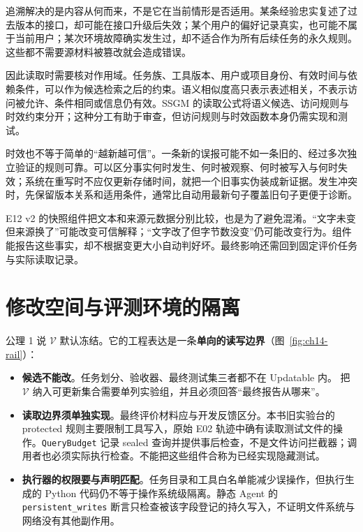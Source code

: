 追溯解决的是内容从何而来，不是它在当前情形是否适用。某条经验忠实复述了过去版本的接口，却可能在接口升级后失效；某个用户的偏好记录真实，也可能不属于当前用户；某次环境故障确实发生过，却不适合作为所有后续任务的永久规则。这些都不需要源材料被篡改就会造成错误。

因此读取时需要核对作用域。任务族、工具版本、用户或项目身份、有效时间与依赖条件，可以作为候选检索之后的约束。语义相似度高只表示表述相关，不表示访问被允许、条件相同或信息仍有效。SSGM 的读取公式将语义候选、访问规则与时效约束分开\cite{ssgm-2603}；这种分工有助于审查，但访问规则与时效函数本身仍需实现和测试。

时效也不等于简单的“越新越可信”。一条新的误报可能不如一条旧的、经过多次独立验证的规则可靠。可以区分事实何时发生、何时被观察、何时被写入与何时失效；系统在重写时不应仅更新存储时间，就把一个旧事实伪装成新证据。发生冲突时，先保留版本关系和适用条件，通常比自动用最新句子覆盖旧句子更便于诊断。

E12 v2 的快照组件把文本和来源元数据分别比较，也是为了避免混淆。“文字未变但来源换了”可能改变可信解释；“文字改了但字节数没变”仍可能改变行为。组件能报告这些事实，却不根据变更大小自动判好坏。最终影响还需回到固定评价任务与实际读取记录。

\section{修改空间与评测环境的隔离}
\label{sec:ch14-iso}

\begin{sloppypar}
公理 1 说 $\mathcal V$ 默认冻结。它的工程表达是一条\textbf{单向的读写边界}（图~\ref{fig:ch14-rail}）：
\end{sloppypar}



\begin{itemize}
  \item \textbf{候选不能改}。任务划分、验收器、最终测试集三者都不在 Updatable 内。
        把 $\mathcal V$ 纳入可更新集合需要单列实验组，并且必须回答“最终报告从哪来”。
  \item \textbf{读取边界须单独实现}。最终评价材料应与开发反馈区分。本书旧实验台的 protected 规则主要限制工具写入，原始 E02 轨迹中确有读取测试文件的操作。\texttt{QueryBudget} 记录 sealed 查询并提供事后检查，不是文件访问拦截器；调用者也必须实际执行检查。不能把这些组件合称为已经实现隐藏测试。
  \item \textbf{执行器的权限要与声明匹配}。任务目录和工具白名单能减少误操作，但执行生成的 Python 代码仍不等于操作系统级隔离。静态 Agent 的 \texttt{persistent\_writes} 断言只检查被该字段登记的持久写入，不证明文件系统与网络没有其他副作用。
\end{itemize}

